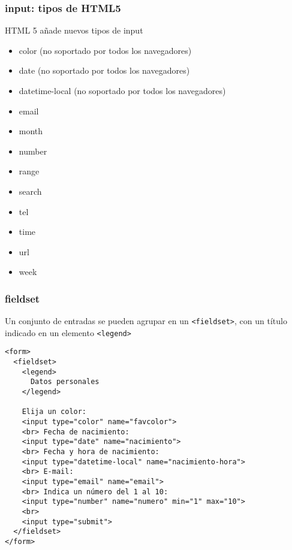 \documentclass[ucs]{beamer}
\begin{document}
\begin{frame}[fragile]
\frametitle{input: tipos de HTML5}
HTML 5 añade nuevos tipos de input
\begin{itemize}
\item
color (no soportado por todos los navegadores)
\item
date (no soportado por todos los navegadores)
\item
datetime-local (no soportado por todos los navegadores)
\item
email
\item
month
\item
number
\item
range
\item
search
\item
tel
\item
time
\item
url
\item
week
\end{itemize}

\end{frame}



\begin{frame}[fragile]
\frametitle{fieldset}
Un conjunto de entradas se pueden agrupar en un
\verb|<fieldset>|,
con un título indicado en un elemento
\verb|<legend>|

  \begin{scriptsize}
  \begin{verbatim}
<form>
  <fieldset>
    <legend>
      Datos personales
    </legend>

    Elija un color:
    <input type="color" name="favcolor">
    <br> Fecha de nacimiento:
    <input type="date" name="nacimiento">
    <br> Fecha y hora de nacimiento:
    <input type="datetime-local" name="nacimiento-hora">
    <br> E-mail:
    <input type="email" name="email">
    <br> Indica un número del 1 al 10:
    <input type="number" name="numero" min="1" max="10">
    <br>
    <input type="submit">
  </fieldset>
</form>

  \end{verbatim}
  \end{scriptsize}

\end{frame}
\end{document}

